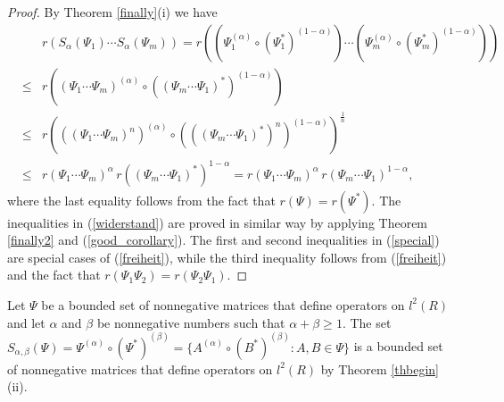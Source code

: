 \documentclass[12pt, reqno]{amsart}
\theoremstyle{definition}
\theoremstyle{remark}
\numberwithin{equation}{section}
\begin{document}
\begin{proof}
By Theorem \ref{finally}(i) we have
\begin{eqnarray}
\nonumber
& & r\left(S_{\alpha} (\Psi_{1}) \cdots  S_{\alpha}(\Psi_{m})\right) =r\left( (\Psi_1 ^{(\alpha)} \circ (\Psi_1^*)^{(1-\alpha)}) \cdots
\left(\Psi_m ^{(\alpha)} \circ (\Psi_m^*)^{(1-\alpha)}\right)\right) \\
\nonumber
&\le &  r\left((\Psi_1 \cdots \Psi_m )^{(\alpha)} \circ ((\Psi_m \cdots \Psi_1)^*)^{(1-\alpha)}  \right)\\
\nonumber
&\le & r\left(((\Psi_1 \cdots \Psi_m )^n)^{(\alpha)} \circ (((\Psi_m \cdots \Psi_1)^*)^n)^{(1-\alpha)}\right)^{\frac{1}{n}}\\
\nonumber
& \le&  r(\Psi_1 \cdots \Psi_m)^{\alpha} \,  r((\Psi_m \cdots \Psi_1)^*)^{1-\alpha} =
 r(\Psi_1 \cdots \Psi_m )^{\alpha} \,  r(\Psi_m \cdots \Psi_1 )^{1-\alpha},
 \end{eqnarray}
  where the last equality follows from  the fact that $r(\Psi)=r(\Psi^*)$. %
  The inequalities in (\ref{widerstand}) are proved in similar way by applying Theorem \ref{finally2} %
  and (\ref{good_corollary}). The first and second inequalities in (\ref{special}) are special cases of (\ref{freiheit}), while the third inequality follows from (\ref{freiheit}) and the fact that $r(\Psi_1\Psi_2)=r(\Psi_2\Psi_1)$.%
\end{proof}
Let $\Psi$ be a bounded set of nonnegative matrices that define operators on $l^2(R)$ and let $\alpha$ and $\beta$ be nonnegative numbers such that $\alpha+\beta \ge 1$. The set $S_{\alpha, \beta}(\Psi)=\Psi^{(\alpha)}\circ(\Psi^*)^{(\beta)}=\{A^{(\alpha)}\circ (B^*)^{(\beta)} : A, B \in \Psi\}$ is a bounded set of nonnegative matrices that define operators on $l^2(R)$ by Theorem \ref{thbegin}(ii). 
\end{document}

